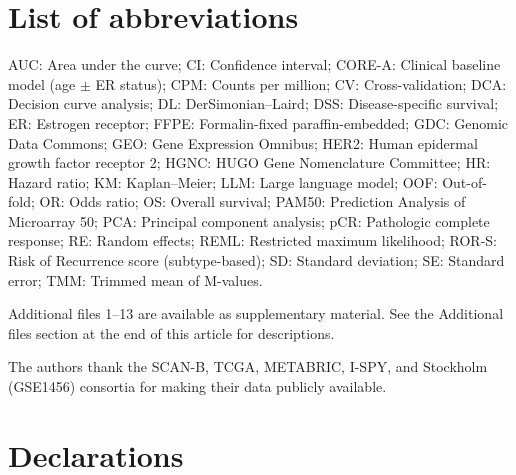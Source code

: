 \documentclass[referee,lineno,pdflatex,sn-vancouver-num]{sn-jnl}
\begin{document}
\backmatter

\section*{List of abbreviations}

\noindent
AUC: Area under the curve;
CI: Confidence interval;
CORE-A: Clinical baseline model (age $\pm$ ER status);
CPM: Counts per million;
CV: Cross-validation;
DCA: Decision curve analysis;
DL: DerSimonian--Laird;
DSS: Disease-specific survival;
ER: Estrogen receptor;
FFPE: Formalin-fixed paraffin-embedded;
GDC: Genomic Data Commons;
GEO: Gene Expression Omnibus;
HER2: Human epidermal growth factor receptor 2;
HGNC: HUGO Gene Nomenclature Committee;
HR: Hazard ratio;
KM: Kaplan--Meier;
LLM: Large language model;
OOF: Out-of-fold;
OR: Odds ratio;
OS: Overall survival;
PAM50: Prediction Analysis of Microarray 50;
PCA: Principal component analysis;
pCR: Pathologic complete response;
RE: Random effects;
REML: Restricted maximum likelihood;
ROR-S: Risk of Recurrence score (subtype-based);
SD: Standard deviation;
SE: Standard error;
TMM: Trimmed mean of M-values.


Additional files 1--13 are available as supplementary material. See the Additional files section at the end of this article for descriptions.


The authors thank the SCAN-B, TCGA, METABRIC, I-SPY, and Stockholm (GSE1456) consortia for making their data publicly available.

\section*{Declarations}
\end{document}
